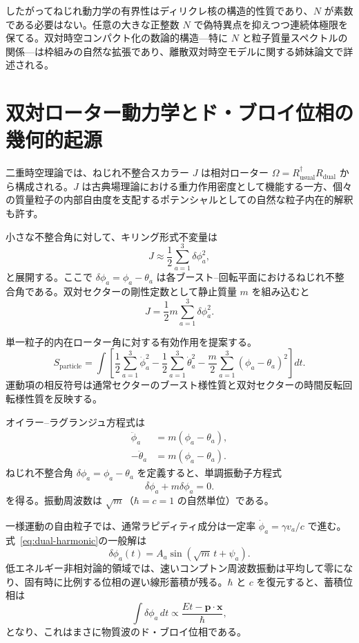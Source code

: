 \documentclass[a4paper]{article}
\begin{document}
したがってねじれ動力学の有界性はディリクレ核の構造的性質であり、$N$ が素数である必要はない。任意の大きな正整数 $N$ で偽特異点を抑えつつ連続体極限を保てる。双対時空コンパクト化の数論的構造---特に $N$ と粒子質量スペクトルの関係---は枠組みの自然な拡張であり、離散双対時空モデルに関する姉妹論文で詳述される。

\section{双対ローター動力学とド・ブロイ位相の幾何的起源}
\label{sec:dualrotordynamics}

二重時空理論では、ねじれ不整合スカラー $J$ は相対ローター $\Omega = R_{\text{usual}}^\dagger R_{\text{dual}}$ から構成される。$J$ は古典場理論における重力作用密度として機能する一方、個々の質量粒子の内部自由度を支配するポテンシャルとしての自然な粒子内在的解釈も許す。

小さな不整合角に対して、キリング形式不変量は
\[
J \approx \frac{1}{2} \sum_{a=1}^3 \delta\phi_a^2,
\]
と展開する。ここで $\delta\phi_a = \phi_a - \theta_a$ は各ブースト--回転平面におけるねじれ不整合角である。双対セクターの剛性定数として静止質量 $m$ を組み込むと
\[
J = \frac{1}{2} m \sum_{a=1}^3 \delta\phi_a^2.
\]

単一粒子的内在ローター角に対する有効作用を提案する。
\[
S_{\text{particle}} = \int \left[ \frac{1}{2} \sum_{a=1}^3 \dot{\phi}_a^2 - \frac{1}{2} \sum_{a=1}^3 \dot{\theta}_a^2 - \frac{m}{2} \sum_{a=1}^3 (\phi_a - \theta_a)^2 \right] dt.
\]
運動項の相反符号は通常セクターのブースト様性質と双対セクターの時間反転回転様性質を反映する。

オイラー--ラグランジュ方程式は
\begin{align}
\ddot{\phi}_a &= m (\phi_a - \theta_a), \\
-\ddot{\theta}_a &= m (\phi_a - \theta_a).
\end{align}
ねじれ不整合角 $\delta\phi_a = \phi_a - \theta_a$ を定義すると、単調振動子方程式
\begin{equation}
\ddot{\delta\phi}_a + m \delta\phi_a = 0.
\label{eq:dual-harmonic}
\end{equation}
を得る。振動周波数は $\sqrt{m}$（$\hbar = c = 1$ の自然単位）である。

一様運動の自由粒子では、通常ラピディティ成分は一定率 $\dot{\phi}_a = \gamma v_a/c$ で進む。式~\eqref{eq:dual-harmonic}の一般解は
\[
\delta\phi_a(t) = A_a \sin(\sqrt{m}\, t + \psi_a).
\]
低エネルギー非相対論的領域では、速いコンプトン周波数振動は平均して零になり、固有時に比例する位相の遅い線形蓄積が残る。$\hbar$ と $c$ を復元すると、蓄積位相は
\[
\int \delta\phi_a \, dt \propto \frac{E t - \mathbf{p} \cdot \mathbf{x}}{\hbar},
\]
となり、これはまさに物質波のド・ブロイ位相である。
\end{document}
